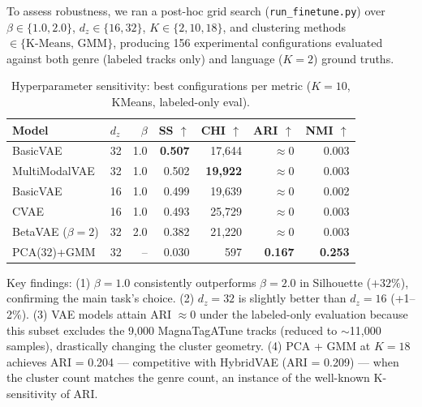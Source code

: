\documentclass{article}
\begin{document}
To assess robustness, we ran a post-hoc grid search (\texttt{run\_finetune.py}) over $\beta \in \{1.0, 2.0\}$, $d_z \in \{16, 32\}$, $K \in \{2, 10, 18\}$, and clustering methods $\in \{\text{K-Means, GMM}\}$, producing 156 experimental configurations evaluated against both genre (labeled tracks only) and language ($K\!=\!2$) ground truths.

\begin{table}[H]
\centering
\caption{Hyperparameter sensitivity: best configurations per metric ($K\!=\!10$, KMeans, labeled-only eval).}
\label{tab:finetune}
\small
\begin{tabular}{llrrrrr}
\toprule
\textbf{Model} & \textbf{$d_z$} & \textbf{$\beta$} & \textbf{SS $\uparrow$} & \textbf{CHI $\uparrow$} & \textbf{ARI $\uparrow$} & \textbf{NMI $\uparrow$} \\
\midrule
BasicVAE        & 32 & 1.0 & \textbf{0.507} & 17,644 & $\approx$0 & 0.003 \\
MultiModalVAE   & 32 & 1.0 & 0.502          & \textbf{19,922} & $\approx$0 & 0.003 \\
BasicVAE        & 16 & 1.0 & 0.499          & 19,639 & $\approx$0 & 0.002 \\
CVAE            & 16 & 1.0 & 0.493          & 25,729 & $\approx$0 & 0.003 \\
BetaVAE ($\beta\!=\!2$) & 32 & 2.0 & 0.382 & 21,220 & $\approx$0 & 0.003 \\
\rowcolor{gray!15} PCA(32)+GMM & 32 & -- & 0.030 & 597 & \textbf{0.167} & \textbf{0.253} \\
\bottomrule
\end{tabular}
\end{table}

Key findings: (1) $\beta\!=\!1.0$ consistently outperforms $\beta\!=\!2.0$ in Silhouette ($+32\%$), confirming the main task's choice. (2) $d_z\!=\!32$ is slightly better than $d_z\!=\!16$ (+1--2\%). (3) VAE models attain ARI $\approx 0$ under the labeled-only evaluation because this subset excludes the 9,000 MagnaTagATune tracks (reduced to $\sim$11,000 samples), drastically changing the cluster geometry. (4) PCA + GMM at $K\!=\!18$ achieves ARI = 0.204 --- competitive with HybridVAE (ARI = 0.209) --- when the cluster count matches the genre count, an instance of the well-known K-sensitivity of ARI.
\end{document}
